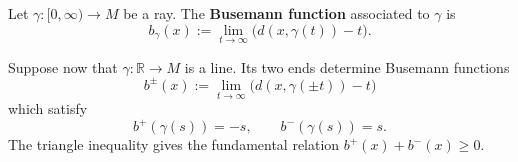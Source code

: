\documentclass[11pt,twoside]{amsart}
\begin{document}

\begin{definition}
\label{def:busemann}
Let $\gamma\colon [0,\infty)\to M$ be a ray. The \textbf{Busemann function} associated to $\gamma$ is
\[
    b_\gamma(x)
    :=
    \lim_{t\to\infty}
    \bigl(d(x,\gamma(t))-t\bigr).
\]
\end{definition}





Suppose now that
$\gamma\colon\mathbb{R}\longrightarrow M$
is a line. Its two ends determine Busemann functions
\[
    b^{\pm}(x)
    :=
    \lim_{t\to\infty}
    \bigl(d(x,\gamma(\pm t))-t\bigr)
\]
which satisfy
\[
    b^+(\gamma(s))=-s,
    \qquad
    b^-(\gamma(s))=s.
\]
The triangle inequality gives the fundamental relation
\(
    b^+(x)+b^-(x)\geq 0.
\)
\end{document}
